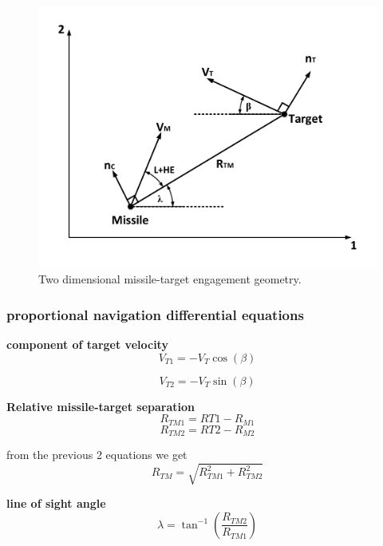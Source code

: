 \begin{figure}[htb]
	\centering
	\includegraphics[scale = 0.65]{fig/PN.pdf}
	\caption{Two dimensional missile-target engagement geometry.}
	\label{PN}
\end{figure}


\subsubsection*{proportional navigation differential equations}

\textbf{component of target velocity} 
\begin{equation}
	V_{T1} = - V_T \cos(\beta)
\end{equation}

\begin{equation}
V_{T2} = - V_T \sin(\beta)
\end{equation}

\textbf{Relative missile-target separation}
\begin{equation}
	R_{TM1} = R{T1} - R_{M1}
\end{equation}
\begin{equation}
R_{TM2} = R{T2} - R_{M2}
\end{equation}

from the previous 2 equations we get
\begin{equation}
	R_{TM} = \sqrt{R_{TM1}^2 + R_{TM2}^2}
	\label{RTM}
\end{equation}

\textbf{line of sight angle}
\begin{equation}
	\lambda = \tan^{-1} (\dfrac{R_{TM2}}{R_{TM1}})
	\label{lambda}
\end{equation}

